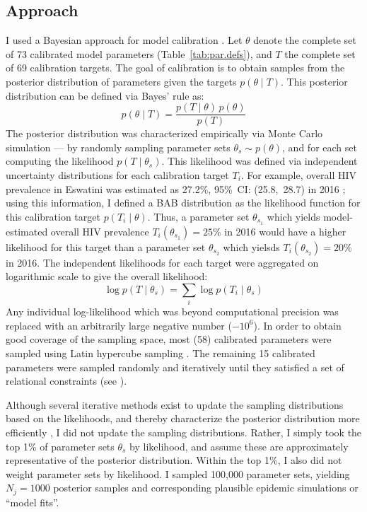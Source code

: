 \subsection{Approach}\label{model.cal.appr}
I used a Bayesian approach for model calibration \cite{Menzies2017}.
Let $\theta$ denote the complete set of 73 calibrated model parameters (Table~\ref{tab:par.defs}),
and $T$ the complete set of 69 calibration targets.
The goal of calibration is to obtain samples from
the posterior distribution of parameters given the targets $p(\theta \mid T)$.
This posterior distribution can be defined via Bayes' rule as:
\begin{equation}
  p(\theta \mid T) = \frac{p(T \mid \theta)\,p(\theta)}{p(T)}
\end{equation}
The posterior distribution was characterized empirically via Monte Carlo simulation
--- \ie by randomly sampling parameter sets $\theta_s \sim p(\theta)$,
and for each set computing the likelihood $p(T \mid \theta_s)$.
This likelihood was defined via
independent uncertainty distributions for each calibration target $T_i$.
For example, overall HIV prevalence in Eswatini was estimated as
27.2\%, 95\%~CI: (25.8,~28.7) in 2016 \cite{SHIMS2};
using this information, I defined a BAB distribution
as the likelihood function for this calibration target $p(T_i \mid \theta)$.
Thus, a parameter set $\theta_{s_1}$ which yields
model-estimated overall HIV prevalence $T_i(\theta_{s_1}) = 25\%$ in 2016
would have a higher likelihood for this target than
a parameter set $\theta_{s_2}$ which yielsds $T_i(\theta_{s_2}) = 20\%$ in 2016.
The independent likelihoods for each target were aggregated on logarithmic scale
to give the overall likelihood:
\begin{equation}
  \log p(T \mid \theta_s) = \sum_i \log p(T_i \mid \theta_s)
\end{equation}
Any individual log-likelihood which was beyond computational precision was replaced with
an arbitrarily large negative number ($-{10}^6$).
In order to obtain good coverage of the sampling space,
most (58) calibrated parameters were sampled using Latin hypercube sampling \cite{Stein1987}.
The remaining 15 calibrated parameters were sampled randomly and iteratively
until they satisfied a set of relational constraints (see ).
\par
Although several iterative methods exist to
update the sampling distributions based on the likelihoods,
and thereby characterize the posterior distribution more efficiently \cite{Menzies2017},
I did not update the sampling distributions.
Rather, I simply took the top 1\% of parameter sets $\theta_s$ by likelihood,
and assume these are approximately representative of the posterior distribution.
Within the top 1\%, I also did not weight parameter sets by likelihood.
I sampled 100,000 parameter sets, yielding $N_j = 1000$ posterior samples and
corresponding plausible epidemic simulations or ``model fits''.
